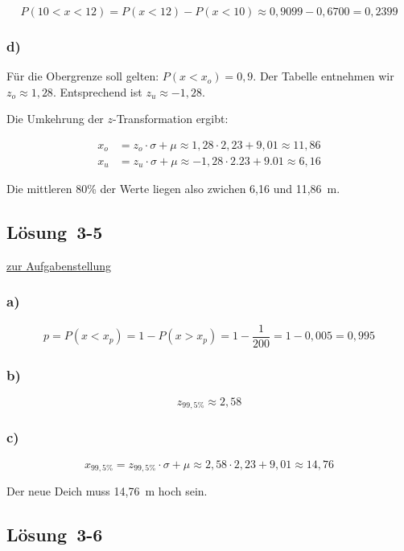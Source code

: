 \documentclass[
  11pt,
  ngerman,
  a4paper,
]{report}
\begin{document}
\[P(10<x<12) = P(x<12) - P(x<10) \approx 0,9099 - 0,6700 = 0,2399\]

\hypertarget{d-4}{%
\subsubsection{d)}\label{d-4}}

Für die Obergrenze soll gelten: \(P(x<x_o) = 0,9\). Der Tabelle entnehmen wir \(z_o \approx 1,28\). Entsprechend ist \(z_u\approx-1,28\).

Die Umkehrung der \(z\)-Transformation ergibt:

\[\begin{aligned}
x_o&=z_o\cdot\sigma + \mu\approx1,28\cdot2,23 +9,01\approx11,86\\
x_u&=z_u\cdot\sigma + \mu\approx-1,28\cdot2.23 +9.01\approx6,16
\end{aligned}\]

Die mittleren 80\% der Werte liegen also zwichen 6,16 und 11,86~m.

\hypertarget{loesung-3-5}{%
\subsection{Lösung~3-5}\label{loesung-3-5}}

\protect\hyperlink{aufgabe-3-5}{zur Aufgabenstellung}

\hypertarget{a-12}{%
\subsubsection{a)}\label{a-12}}

\[p=P(x<x_p)=1-P(x>x_p)=1-\frac{1}{200}=1-0,005=0,995\]

\hypertarget{b-12}{%
\subsubsection{b)}\label{b-12}}

\[z_{99,5\%}\approx2,58\]

\hypertarget{c-10}{%
\subsubsection{c)}\label{c-10}}

\[x_{99,5\%}=z_{99,5\%}\cdot\sigma + \mu\approx2,58\cdot2,23+9,01\approx14,76\]

Der neue Deich muss 14,76~m hoch sein.

\hypertarget{loesung-3-6}{%
\subsection{Lösung~3-6}\label{loesung-3-6}}
\end{document}
